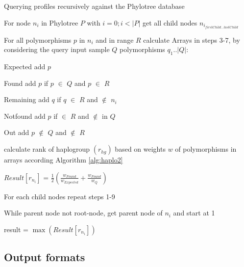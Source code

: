 \begin{algorithm}
\caption{Querying profiles recursively against the Phylotree database}
\label{list:pseudo}

For node $n_{i}$ in Phylotree $P$ with $i=0; i<|P|$ get all child nodes $n_{i_{firstChild...lastChild}}$

For all polymorphisms $p$ in $n_{i}$ and in range $R$ calculate Arrays in steps 3-7, by considering the query input sample $Q$ polymorphisms $q_{1}..{|Q|}$:

Expected add $p$

Found add $p$ if $p$ $\in$ $Q$ and $p$ $\in$ $R$ 

Remaining add $q$ if $q$  $\in$ $R$ and $\not\in$ $n_{i}$

Notfound add $p$ if $\in$ $R$ and $\not\in$ in $Q$

Out add $p$ $\not\in$ $Q$ and $\not\in$ $R$

calculate rank of haplogroup $(r_{hg})$ based on weights $w$ of polymorphisms in arrays according Algorithm \ref{alg:haplo2}

$Result[r_{n_{i}}]$ = $ \frac{1}{2}\left(\frac{w_{Found}}{w_{Expected}} +  \frac{w_{Found}}{w_{Q}}\right)$

For each child nodes repeat steps 1-9

While parent node not root-node, get parent node of $n_{i}$ and start at 1

result = $\max (Result[r_{n_{i}}]) $

\end{algorithm}



\subsection{Output formats}

